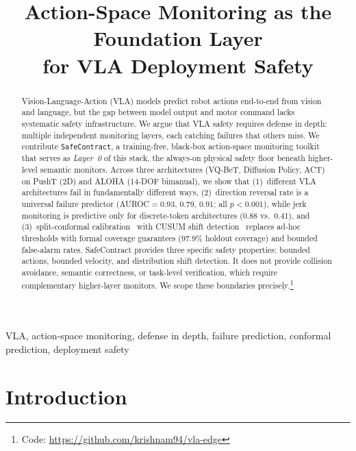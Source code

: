\documentclass[conference]{IEEEtran}
\begin{document}
\title{Action-Space Monitoring as the Foundation Layer\\for VLA Deployment Safety}

\author{
}

\maketitle

\begin{abstract}
Vision-Language-Action (VLA) models predict robot actions end-to-end from vision and language, but the gap between model output and motor command lacks systematic safety infrastructure.
We argue that VLA safety requires defense in depth: multiple independent monitoring layers, each catching failures that others miss.
We contribute \texttt{SafeContract}, a training-free, black-box action-space monitoring toolkit that serves as \emph{Layer~0} of this stack, the always-on physical safety floor beneath higher-level semantic monitors.
Across three architectures (VQ-BeT, Diffusion Policy, ACT) on PushT (2D) and ALOHA (14-DOF bimanual), we show that (1)~different VLA architectures fail in fundamentally different ways, (2)~direction reversal rate is a universal failure predictor (AUROC${=}$0.93, 0.79, 0.91; all $p < 0.001$), while jerk monitoring is predictive only for discrete-token architectures (0.88 vs.\ 0.41), and (3)~split-conformal calibration~\cite{vovk2005} with CUSUM shift detection~\cite{page1954} replaces ad-hoc thresholds with formal coverage guarantees (97.9\% holdout coverage) and bounded false-alarm rates.
SafeContract provides three specific safety properties: bounded actions, bounded velocity, and distribution shift detection.
It does not provide collision avoidance, semantic correctness, or task-level verification, which require complementary higher-layer monitors.
We scope these boundaries precisely.\footnote{Code: \url{https://github.com/krishnam94/vla-edge}}
\end{abstract}

\begin{IEEEkeywords}
VLA, action-space monitoring, defense in depth, failure prediction, conformal prediction, deployment safety
\end{IEEEkeywords}

\section{Introduction}
\end{document}
